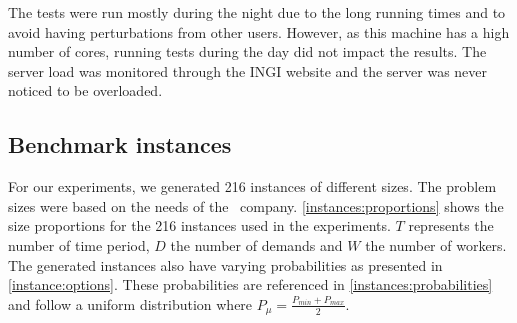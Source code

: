 \documentclass[../../thesis.tex]{subfiles}
\begin{document}
The tests were run mostly during the night due to the long running times and to avoid having 
perturbations from other users. However, as this machine has a high number of cores, running tests 
during the day did not impact the results. 
The server load was monitored through the INGI website \cite{jabba:monitoring} and the server was never noticed to be overloaded.

\subsection{Benchmark instances}

For our experiments, we generated 216 instances of different sizes. The problem sizes were based on the needs of the \vone\ company.
\autoref{instances:proportions} shows the size proportions for the 216 instances used in the experiments. $T$ represents the number of time period, $D$ the number of demands and $W$ the number of workers. The generated instances also have varying probabilities as presented in \autoref{instance:options}. These probabilities are referenced in \autoref{instances:probabilities} and follow a uniform distribution where $P_{\mu} = \frac{P_{min} + P_{max}}{2}$.
\end{document}
